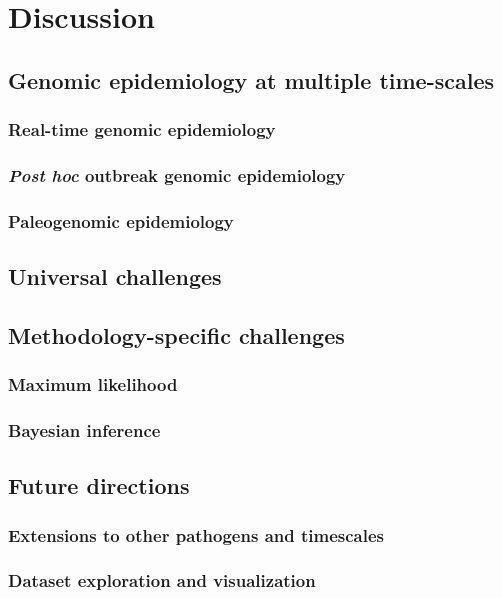 \chapter{Discussion}
\label{ch:discussion}

\section{Genomic epidemiology at multiple time-scales}

\subsection{Real-time genomic epidemiology}
\subsection{\textit{Post hoc} outbreak genomic epidemiology}
\subsection{Paleogenomic epidemiology}

\section{Universal challenges}

\section{Methodology-specific challenges}
\subsection{Maximum likelihood}
\subsection{Bayesian inference}

\section{Future directions}
\subsection{Extensions to other pathogens and timescales}
\subsection{Dataset exploration and visualization}
